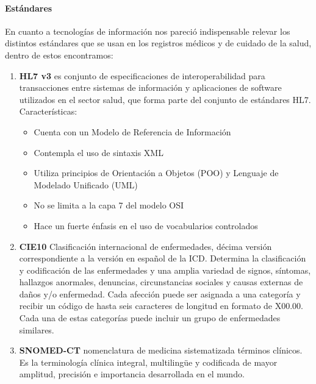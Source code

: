 \paragraph{Estándares}


En cuanto a tecnologías de información nos pareció indispensable relevar los distintos estándares que se usan en los registros médicos y de cuidado de la salud, dentro de estos encontramos:

\begin{enumerate}
	\item\textbf{HL7 v3} es conjunto de especificaciones de interoperabilidad para transacciones entre sistemas de información y aplicaciones de software utilizados en el sector salud, que forma parte del conjunto de estándares HL7. Características:
    	\begin{itemize}
			\item Cuenta con un Modelo de Referencia de Información
            \item Contempla el uso de sintaxis XML
            \item Utiliza principios de Orientación a Objetos (POO) y Lenguaje de Modelado Unificado (UML)
            \item No se limita a la capa 7 del modelo OSI
            \item Hace un fuerte énfasis en el uso de vocabularios controlados
		\end{itemize}
    
    \item\textbf{CIE10}  Clasificación internacional de enfermedades, décima versión correspondiente a la versión en español de la ICD. Determina la clasificación y codificación de las enfermedades y una amplia variedad de signos, síntomas, hallazgos anormales, denuncias, circunstancias sociales y causas externas de daños y/o enfermedad. Cada afección puede ser asignada a una categoría y recibir un código de hasta seis caracteres de longitud en formato de X00.00. Cada una de estas categorías puede incluir un grupo de enfermedades similares.
    
    \item\textbf{SNOMED-CT} nomenclatura de medicina sistematizada \- términos clínicos. Es la terminología clínica integral, multiling\"{u}e y codificada de mayor amplitud, precisión e importancia desarrollada en el mundo.
    

\end{enumerate}

